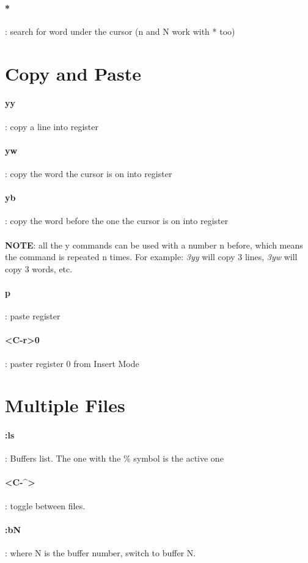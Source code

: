 \documentclass[10pt,letterpaper]{book}
\begin{document}
\paragraph{*}: search for word under the cursor (n and N work with * too)
\section{Copy and Paste}
\paragraph{yy}: copy a line into register
\paragraph{yw}: copy the word the cursor is on into register
\paragraph{yb}: copy the word before the one the cursor is on into register\\ \\
\textbf{NOTE}: all the y commands can be used with a number n before, which means the command is repeated n times. For example: \textit{3yy} will copy 3 lines, \textit{3yw} will copy 3 words, etc.
\paragraph{p}: paste register
\paragraph{<C-r>0}: paster register 0 from Insert Mode
\section{Multiple Files}
\paragraph{:ls}: Buffers list. The one with the \% symbol is the active one
\paragraph{<C-\^{}>}: toggle between files.
\paragraph{:bN}: where N is the buffer number, switch to buffer N.
\end{document}
